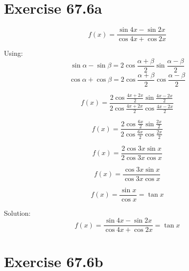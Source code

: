 \documentclass[a4paper, 10pt]{scrartcl}
\begin{document}
\section{Exercise 67.6a}

\[f(x) = \frac{\sin{4x} - \sin{2x}}{\cos{4x} + \cos{2x}}\]

Using:
\[\sin{\alpha} - \sin{\beta} = 2\cos{\frac{\alpha + \beta}{2}}\sin{\frac{\alpha - \beta}{2}}\]
\[\cos{\alpha} + \cos{\beta} = 2\cos{\frac{\alpha + \beta}{2}}\cos{\frac{\alpha - \beta}{2}}\]

\[f(x) = \frac{2\cos{\frac{4x + 2x}{2}}\sin{\frac{4x - 2x}{2}}}
              {2\cos{\frac{4x + 2x}{2}}\cos{\frac{4x - 2x}{2}}}\]

\[f(x) = \frac{2\cos{\frac{6x}{2}}\sin{\frac{2x}{2}}}
              {2\cos{\frac{6x}{2}}\cos{\frac{2x}{2}}}\]

\[f(x) = \frac{2\cos{3x}\sin{x}}
              {2\cos{3x}\cos{x}}\]

\[f(x) = \frac{\cos{3x}\sin{x}}
              {\cos{3x}\cos{x}}\]

\[f(x) = \frac{\sin{x}}{\cos{x}} = \tan{x}\]

Solution:
\[f(x) = \frac{\sin{4x} - \sin{2x}}{\cos{4x} + \cos{2x}} = \tan{x}\]

\section{Exercise 67.6b}
\end{document}
